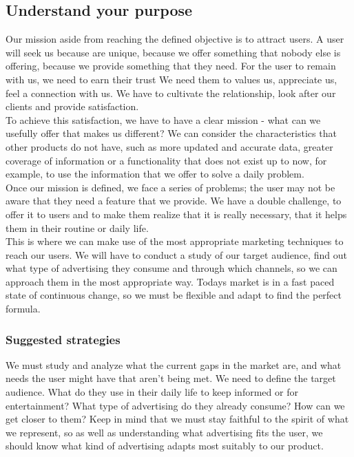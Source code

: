 \subsection{Understand your purpose}

Our mission aside from reaching the defined objective is to attract users.
A user will seek us because are unique, because we offer something that
nobody else is offering, because we provide something that they need.
For the user to remain with us, we need to earn their trust We need them to values us, appreciate us, feel a connection with us.
We have to cultivate the relationship, look after our clients and provide satisfaction.\\

To achieve this satisfaction, we have to have a clear mission - what can we usefully offer that makes us different?
We can consider the characteristics that other products do not have, such as more updated and accurate data,
greater coverage of information or a functionality that does not exist up to now, for example, to use the
information that we offer to solve a daily problem.\\

Once our mission is defined, we face a series of problems; the user may not be aware that they need a feature that we provide. We have a double challenge, to offer it to users and
to make them realize that it is really necessary, that it helps them in their routine or daily life.\\

This is where we can make use of the most appropriate marketing techniques to reach our users.
We will have to conduct a study of our target audience, find out what type of advertising they consume and through which channels, so we can approach them in the most appropriate way. Todays market is in a fast paced state of continuous change,
so we must be flexible and adapt to find the perfect formula.

\subsubsection*{Suggested strategies}

We must study and analyze what the current gaps in the market are, and what needs the user might have that aren't being met.
We need to define the target audience. What do they use in their daily life to keep informed or for entertainment? What type of advertising do they already consume? How can we get closer to them? Keep in mind that we must stay
faithful to the spirit of what we represent, so as well as understanding what advertising fits the user, we should know what kind of advertising
adapts most suitably to our product.

